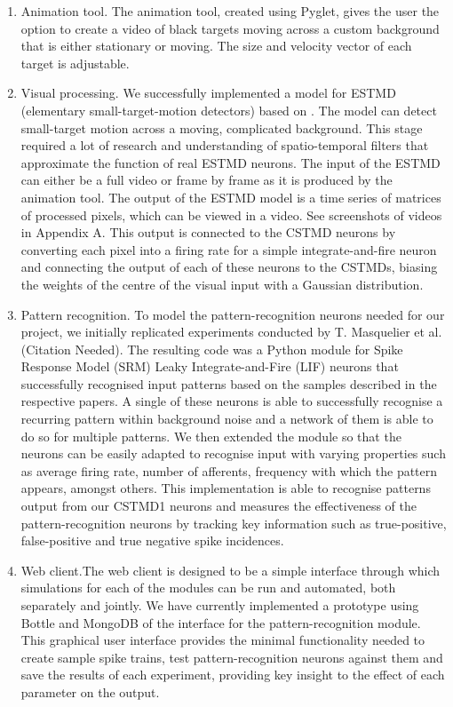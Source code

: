 \documentclass[a4paper,11pt]{article}
\begin{document}
\begin{enumerate}

	\item Animation tool. The animation tool, created using Pyglet, gives the user the option to create a video of black targets moving across a custom background that is either stationary or moving. The size and velocity vector of each target is adjustable.
	\item Visual processing. We successfully implemented a model for ESTMD (elementary small-target-motion detectors) based on \cite{hal11}. The model can detect small-target motion across a moving, complicated background. This stage required a lot of research and understanding of spatio-temporal filters that approximate the function of real ESTMD neurons. The input of the ESTMD can either be a full video or frame by frame as it is produced by the animation tool. The output of the ESTMD model is a time series of matrices of processed pixels, which can be viewed in a video. See screenshots of videos in Appendix A.
This output is connected to the CSTMD neurons by converting each pixel into a firing rate for a simple integrate-and-fire neuron and connecting the output of each of these neurons to the CSTMDs, biasing the weights of the centre of the visual input with a Gaussian distribution.
	\item Pattern recognition. To model the pattern-recognition neurons needed for our project, we initially replicated experiments conducted by T. Masquelier et al. (Citation Needed). The resulting code was a Python module for Spike Response Model (SRM) Leaky Integrate-and-Fire (LIF) neurons that successfully recognised input patterns based on the samples described in the respective papers. A single of these neurons is able to successfully recognise a recurring pattern within background noise and a network of them is able to do so for multiple patterns. We then extended the module so that the neurons can be easily adapted to recognise input with varying properties such as average firing rate, number of afferents, frequency with which the pattern appears, amongst others. This implementation is able to recognise patterns output from our CSTMD1 neurons and measures the effectiveness of the pattern-recognition neurons by tracking key information such as true-positive, false-positive and true negative spike incidences.
	\item Web client.The web client is designed to be a simple interface through which simulations for each of the modules can be run and automated, both separately and jointly. We have currently implemented a prototype using Bottle and MongoDB of the interface for the pattern-recognition module. This graphical user interface provides the minimal functionality needed to create sample spike trains, test pattern-recognition neurons against them and save the results of each experiment, providing key insight to the effect of each parameter on the output.
\end{enumerate}
\end{document}

